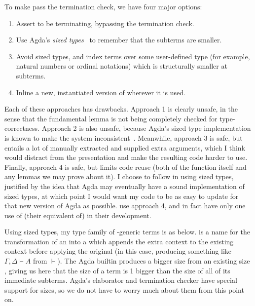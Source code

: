 To make  pass the termination check, we have four major
options:
\begin{enumerate}
  \item Assert  to be terminating, bypassing the termination
    check.
  \item Use Agda's \emph{sized types}~\citep{Abel10} to remember that the
    subterms are smaller.
  \item Avoid sized types, and index terms over some user-defined type (for
    example, natural numbers or ordinal notations) which is structurally smaller
    at subterms.
  \item Inline a new, instantiated version of  wherever it
    is used.
\end{enumerate}

Each of these approaches has drawbacks.
Approach 1 is clearly unsafe, in the sense that the fundamental lemma
 is not being completely checked for type-correctness.
Approach 2 is also unsafe, because Agda's sized type implementation is known to
make the system inconsistent~\citep{AgdaIssue1201}.
Meanwhile, approach 3 is safe, but entails a lot of manually extracted and
supplied extra arguments, which I think would distract from the presentation and
make the resulting code harder to use.
Finally, approach 4 is safe, but limits code reuse (both of the function
 itself and any lemmas we may prove about it).
I choose to follow \citet{AACMM21} in using sized types, justified by the idea
that Agda may eventually have a sound implementation of sized types, at which
point I would want my code to be as easy to update for that new version of Agda
as possible.
 use approach 4, and in fact have only one use of (their equivalent
of)  in their development.

Using sized types, my type family of -generic terms is as
below.
 is a name for the transformation of an
 into a \AgdaSpace{}\AgdaSymbol{$\to$}%
\AgdaSpace{} which appends the extra context to the
existing context before applying the original 
(in this case, producing something like $\Gamma, \Delta \vdash A$ from
$\vdash$).
The Agda builtin \AgdaPostulate{$\uparrow$} produces a bigger size from an
existing size , giving us here that the size of a term is 1 bigger
than the size of all of its immediate subterms.
Agda's elaborator and termination checker have special support for sizes, so we
do not have to worry much about them from this point on.

